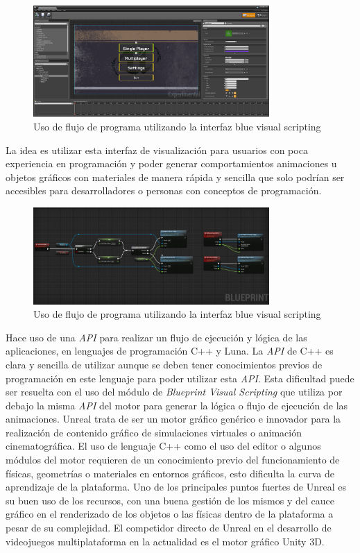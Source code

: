 \documentclass[a4paper]{book}
\begin{document}
\begin{figure}[H]
    \centering
    \includegraphics[width=9cm, keepaspectratio]{img/menu_unreal.png}
    \caption{Uso de flujo de programa utilizando la interfaz blue visual scripting}
    \label{menu_unreal}
\end{figure}

La idea es utilizar esta interfaz de visualización para usuarios con poca experiencia en programación
y poder generar comportamientos animaciones u objetos gráficos con materiales de manera rápida y
sencilla que solo podrían ser accesibles para desarrolladores o personas con conceptos de programación.

\begin{figure}[H]
    \centering
    \includegraphics[width=9cm, keepaspectratio]{img/option1_unreal.jpg}
    \caption{Uso de flujo de programa utilizando la interfaz blue visual scripting}
    \label{option1_unreal}
\end{figure}

Hace uso de una \textit{API} para realizar un flujo de ejecución y lógica de las aplicaciones, en lenguajes de
programación C++ y Luna. La \textit{API} de C++ es clara y sencilla de utilizar aunque se deben tener conocimientos
previos de programación en este lenguaje para poder utilizar esta \textit{API}. Esta dificultad puede ser resuelta
con el uso del módulo de  \textit{Blueprint Visual Scripting} que utiliza por debajo la misma \textit{API} del motor para
generar la lógica o flujo de ejecución de las animaciones. Unreal trata de ser un motor gráfico genérico e innovador
para la realización de contenido gráfico de simulaciones virtuales o animación cinematográfica. El uso de lenguaje C++
como el uso del editor o algunos módulos del motor requieren de un conocimiento previo del funcionamiento de físicas, geometrías
o materiales en entornos gráficos, esto dificulta la curva de aprendizaje de la plataforma. Uno de los principales puntos
fuertes de Unreal es su buen uso de los recursos, con una buena gestión de los mismos y del cauce gráfico en el
renderizado de los objetos o las físicas dentro de la plataforma a pesar de su complejidad. El competidor directo de Unreal
en el desarrollo de videojuegos multiplataforma en la actualidad es el motor gráfico Unity 3D.
\end{document}
